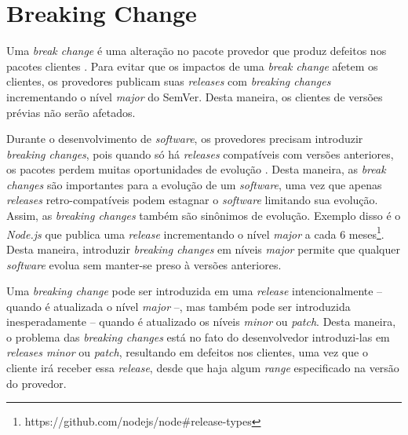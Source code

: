 \section{Breaking Change}
\label{ref-teo:breaking_change}
Uma \textit{break change} é uma alteração no pacote provedor que produz defeitos nos pacotes clientes \cite{teorical_reference:semver}. Para evitar que os impactos de uma \textit{break change} afetem os clientes, os provedores publicam suas \textit{releases} com \textit{breaking changes} incrementando o nível \textit{major} do \gls{SemVer}. Desta maneira, os clientes de versões prévias não serão afetados.

Durante o desenvolvimento de \textit{software}, os provedores precisam introduzir \textit{breaking changes}, pois quando só há \textit{releases} compatíveis com versões anteriores, os pacotes perdem muitas oportunidades de evolução \cite{teorical_reference:bc_2}. Desta maneira, as \textit{break changes} são importantes para a evolução de um \textit{software}, uma vez que apenas \textit{releases} retro-compatíveis podem estagnar o \textit{software} limitando sua evolução. Assim, as \textit{breaking changes} também são sinônimos de evolução. Exemplo disso é o \textit{Node.js} que publica uma \textit{release} incrementando o nível \textit{major} a cada 6 meses\footnote{https://github.com/nodejs/node\#release-types}. Desta maneira, introduzir \textit{breaking changes} em níveis \textit{major} permite que qualquer \textit{software} evolua sem manter-se preso à versões anteriores.

Uma \textit{breaking change} pode ser introduzida em uma \textit{release} intencionalmente -- quando é atualizada o nível \textit{major} --, mas também pode ser introduzida inesperadamente -- quando é atualizado os níveis \textit{minor} ou \textit{patch}. Desta maneira, o problema das \textit{breaking changes} está no fato do desenvolvedor introduzi-las em \textit{releases minor} ou \textit{patch}, resultando em defeitos nos clientes, uma vez que o cliente irá receber essa \textit{release}, desde que haja algum \textit{range} especificado na versão do provedor.
